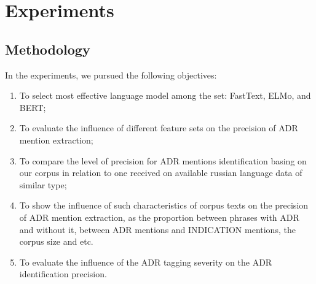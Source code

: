 \documentclass[a4paper,fleqn,longmktitle]{cas-dc}
\newcommand{\Fp}{F_1^\text{partial}}
\begin{document}
\begin{comment}
\paragraph{$\Fp$.}
For every $i$-th sentence from the test dataset we calculated the values of $\mathrm{precision}_{i}$, $\mathrm{recall}_{i}$, and $F_{1i}$ using the following equations:
\begin{gather*}
	\mathrm{precision}_{i} = \frac{\left | t _{i} \cap t_{si}\right |}{\left | t_{si} \right |}
\\
	\mathrm{recall}_{i} = \frac{\left | t_{i} \cap t_{si}\right |}{\left | t_{i} \right |}
\\
	F_{1i} = 2 \cdot \frac{\mathrm{precision}_{i} \cdot \mathrm{recall}_{i}}{\mathrm{precision}_{i} + \mathrm{recall}_{i}}
\end{gather*}
where $t_{si}$ is the list of tokens of $i$-th sentence that were recognized by the model as parts of mentions, $t_{i}$ is the list of tokens belonging to ground truth mentions of $i$-th sentence, and $| t_{i} |$ is the list length (the number of tokens in $t_{i}$).
The final $\Fp$ is calculated as the mean of $F_{1i}$ over all $i$ in the set $T$ of sentences in the text that contain any mentions.:
	$$\Fp = \frac{1}{\left | T \right |}\sum_{i=1}^{|T|} F_{1i}.$$
\end{comment}

\section{Experiments}\label{subsec:Experiments}
\subsection{Methodology}
In the experiments, we pursued the following objectives: 
\begin{enumerate}
    \item To select most effective language model among the set: FastText, ELMo, and BERT;
    \item To evaluate the influence of different feature sets on the precision of  ADR mention extraction;
    \item To compare the level of precision for ADR mentions identification basing on our corpus in relation to one received  on available russian language data of similar type;
    \item To show  the influence of  such characteristics of  corpus texts on the precision of  ADR mention extraction, as the proportion between phrases with ADR  and without  it, between ADR mentions and INDICATION mentions, the corpus size and etc.         \item To evaluate the influence of the ADR tagging severity on the ADR identification precision.
\end{enumerate}
\end{document}
